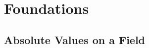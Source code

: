 \documentclass[a4paper, 11pt]{memoir}
\theoremstyle{plaincustomnumber}
\theoremstyle{changedotbreakcustomnumber}
\newcommand{\keyword}[1]{\ifbool{indefinition}{{\itshape #1}}{{\itshape\bfseries #1}}}
\begin{document}






\setcounter{chapter}{1}

\chapter{Foundations}

\section{Absolute Values on a Field}
\end{document}
